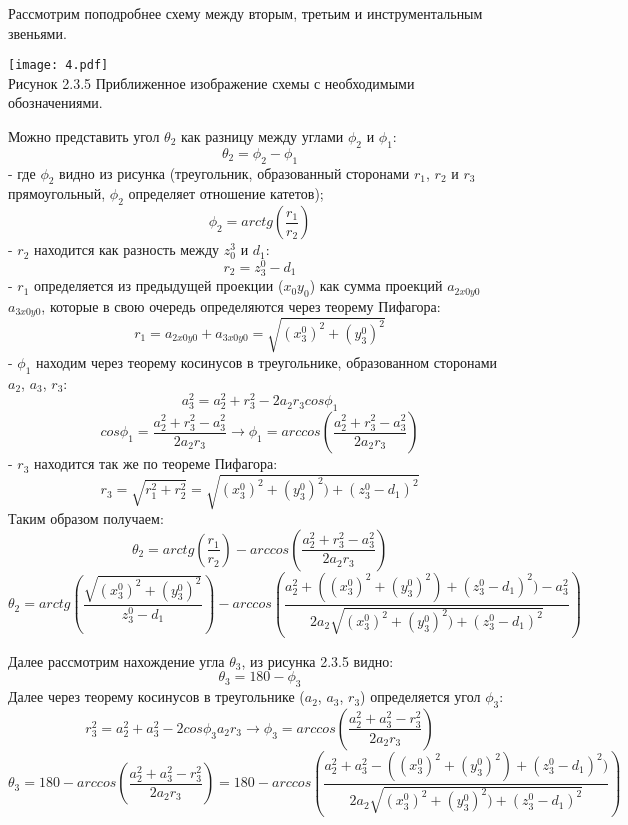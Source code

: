 \begin{enumerate}
Рассмотрим поподробнее схему между вторым, третьим и инструментальным звеньями.\\

\begin{center}
    \texttt{[image: 4.pdf]}\\
         Рисунок 2.3.5 Приближенное изображение схемы с необходимыми обозначениями. \\

\end{center}

Можно представить угол $\theta_2$ как разницу между углами $\phi_2$ и $\phi_1$:\\
$$\theta_2 = \phi_2 - \phi_1$$
- где $\phi_2$ видно из рисунка (треугольник, образованный сторонами $r_1$, $r_2$ и $r_3$ прямоугольный, $\phi_2$ определяет отношение катетов);
$$\phi_2 = arctg(\frac{r_1}{r_2})$$
- $r_2$ находится как разность между $z_0^3$ и $d_1$: \\
$$r_2=z_3^0 - d_1$$
- $r_1$ определяется из предыдущей проекции ($x_0y_0$) как сумма проекций $a_{2x0y0}$ $a_{3x0y0}$, которые в свою очередь определяются через теорему Пифагора:\\ $$r_1=a_{2x0y0}+a_{3x0y0}=\sqrt{(x_3^0)^2+(y_3^0)^2}$$
- $\phi_1$ находим через теорему косинусов в треугольнике, образованном сторонами $a_2$, $a_3$, $r_3$:\\
$$a_3^2 = a_2^2 + r_3^2 - 2 a_2 r_3 cos\phi_1$$
$$cos\phi_1 = \frac{a_2^2 + r_3^2 - a_3^2}{2 a_2 r_3} \rightarrow \phi_1 = arccos(\frac{a_2^2 + r_3^2 - a_3^2}{2 a_2 r_3})$$
- $r_3$ находится так же по теореме Пифагора:\\
$$r_3=\sqrt{r_1^2+r_2^2}=\sqrt{(x_3^0)^2+(y_3^0)^2)+(z_3^0 - d_1)^2}$$
Таким образом получаем:\\
$$\theta_2=arctg(\frac{r_1}{r_2}) - arccos(\frac{a_2^2 + r_3^2 - a_3^2}{2 a_2 r_3})$$
$$ \theta_2=arctg(\frac{\sqrt{(x_3^0)^2+(y_3^0)^2}}{z_3^0-d_1}) - arccos(\frac{a_2^2 + ((x_3^0)^2+(y_3^0)^2)+(z_3^0 - d_1)^2) - a_3^2}{2 a_2 \sqrt{(x_3^0)^2+(y_3^0)^2)+(z_3^0 - d_1)^2}}) $$

Далее рассмотрим нахождение угла $\theta_3$, из рисунка 2.3.5 видно:
$$\theta_3=180-\phi_3$$
Далее через теорему косинусов в треугольнике ($a_2$, $a_3$, $r_3$) определяется угол $\phi_3$:\\
$$r_3^2=a_2^2+a_3^2 - 2cos\phi_3 a_2 r_3 \rightarrow \phi_3 = arccos(\frac{a_2^2 + a_3^2 -r_3^2}{2a_2 r_3})$$
$$\theta_3=180-arccos(\frac{a_2^2 + a_3^2 -r_3^2}{2a_2 r_3})=180-arccos(\frac{a_2^2 + a_3^2 -((x_3^0)^2+(y_3^0)^2)+(z_3^0 - d_1)^2)}{2a_2 \sqrt{(x_3^0)^2+(y_3^0)^2)+(z_3^0 - d_1)^2}})$$

 \end{enumerate}